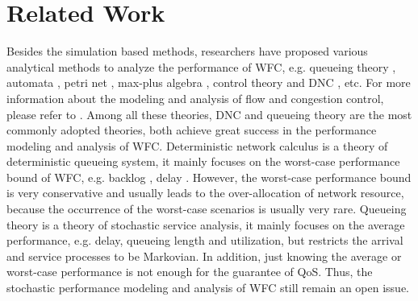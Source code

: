\documentclass[12pt]{article}
\begin{document}
\section{Related Work}\label{relate}
Besides the simulation based methods, researchers have proposed various analytical methods to analyze the performance of WFC, e.g. queueing theory \cite{1094531,Chu:1981:ATQ:1310158.1310656,berger1992impact,jung1996analysis,1095377,1092752,113869}, automata \cite{Billington:2007:FTD:1366708.1366712}, petri net \cite{Gaeta2003}, max-plus algebra \cite{BaHo00}, control theory \cite{wang2008internet} and DNC \cite{CrOk96,AgRa96,Chan98,ACOR99,QLDD09FC,bose2006analysis,Qian2010Analysis}, etc. For more information about the modeling and analysis of flow and congestion control, please refer to \cite{srikant2004mathematics}. Among all these theories, DNC and queueing theory are the most commonly adopted theories, both achieve great success in the performance modeling and analysis of WFC. Deterministic network calculus is a theory of deterministic queueing system, it mainly focuses on the worst-case performance bound of WFC, e.g. backlog \cite{QLDD09FC,bose2006analysis}, delay \cite{Qian2010Analysis}. However, the worst-case performance bound is very conservative and usually leads to the over-allocation of network resource, because the occurrence of the worst-case scenarios is usually very rare. Queueing theory is a theory of stochastic service analysis, it mainly focuses on the average performance, e.g. delay, queueing length and utilization, but restricts the arrival and service processes to be Markovian. In addition, just knowing the average or worst-case performance is not enough for the guarantee of QoS. Thus, the stochastic performance modeling and analysis of WFC still remain an open issue.
\end{document}
